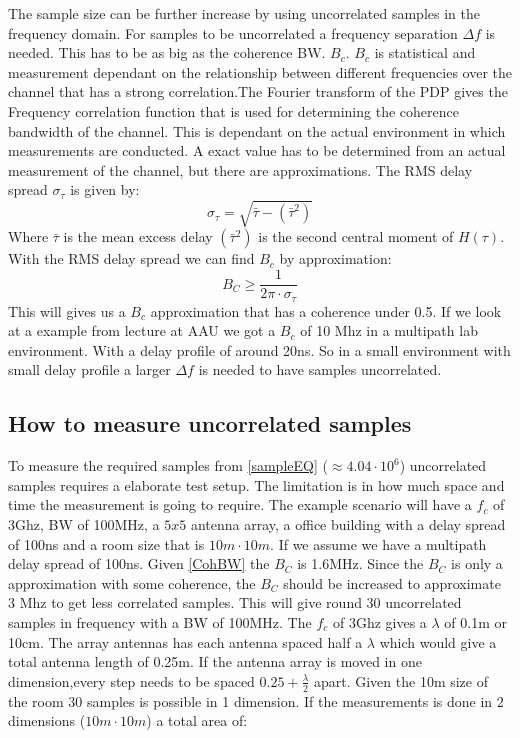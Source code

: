 The sample size can be further increase by using uncorrelated samples in the frequency domain. 
For samples to be uncorrelated a frequency separation $\Delta f$  is needed. This has to be as big as the coherence BW. $B_{c}$. $B_{c}$ is statistical and measurement dependant on the relationship between different frequencies over the channel that has a strong correlation.The Fourier transform of the PDP gives the Frequency correlation function that is used for determining the coherence bandwidth of the channel. This is dependant on the actual environment in which measurements are conducted. A exact value has to be determined from  an actual measurement of the channel, but there are approximations\citep{RayFadeHandbook}. The RMS delay spread $\sigma_{\tau}$ is given by:
\begin{equation}
\sigma_{\tau} = \sqrt{\bar{\tau} - {(\bar{\tau}^{2})}}
\end{equation}
Where $\bar{\tau}$ is the mean excess delay $(\bar{\tau}^{2})$ is 
the second central moment of $H(\tau)$. With the RMS delay spread we can find $B_c$ by approximation:
\begin{equation}
B_C \geq \frac{1}{2\pi \cdot \sigma_{\tau}}
\label{CohBW}
\end{equation}
This will gives us a $B_c$ approximation that has a coherence under 0.5. 
\citep{CohBW}
If we look at a example from lecture at AAU we got a $B_c$ of 10 Mhz in a multipath lab environment.
 With a delay profile of around 20ns. So in a small environment with small delay profile a larger $\Delta f$ is needed to have samples uncorrelated.
\citep[Chapter 18.5]{ComHandbook}

\subsection{How to measure uncorrelated samples}
\label{howtomeasureUS}
To measure the required samples from \autoref{sampleEQ} ($\approx 4.04\cdot10^6$) uncorrelated samples requires a elaborate test setup. The limitation is in how much space and time the measurement is going to require. The example scenario  will have a $f_c$ of 3Ghz, BW of 100MHz, a $5x5$ antenna array, a office building with a delay spread of 100ns and a room size that is $10m \cdot 10m$.
If we assume we have a multipath delay spread of 100ns. Given \autoref{CohBW} the $B_C$ is 1.6MHz. Since the $B_C$ is only a approximation with some coherence, the $B_C$ should be increased to approximate 3 Mhz to get less correlated samples. This will give round 30 uncorrelated samples in frequency with a BW of 100MHz.
The $f_c$ of 3Ghz gives a $\lambda$ of 0.1m or 10cm. The array antennas has each antenna spaced half a $\lambda$ which would give a total antenna length of 0.25m. If the antenna array is moved in one dimension,every step needs to be spaced $0.25+\frac{\lambda}{2}$ apart. Given the 10m size of the room 30 samples is possible in 1 dimension. If the measurements is done in 2 dimensions ($10m\cdot 10m$) a total area of:


